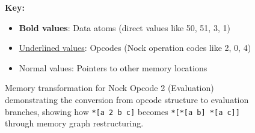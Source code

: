 \begin{figure}[htbp]
\vspace{0.3cm}

\begin{minipage}{\textwidth}
\small
\textbf{Key:}
\begin{itemize}
\item \textbf{Bold values}: Data atoms (direct values like 50, 51, 3, 1)
\item \underline{Underlined values}: Opcodes (Nock operation codes like 2, 0, 4)
\item Normal values: Pointers to other memory locations
\end{itemize}
\end{minipage}

\caption{Memory transformation for Nock Opcode 2 (Evaluation) demonstrating the conversion from opcode structure to evaluation branches, showing how \texttt{*[a 2 b c]} becomes \texttt{*[*[a b] *[a c]]} through memory graph restructuring.}
\label{fig:memory-transformation}
\end{figure}
